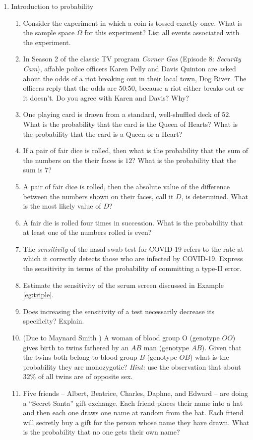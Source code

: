 \documentclass[11pt]{article}
\begin{document}
\begin{enumerate}
  \item Introduction to probability
    \begin{enumerate}
      \item Consider the experiment in which a coin is tossed exactly once. What is the sample space $\Omega$ for this experiment? List all events associated with the experiment.
      \item In Season 2 of the classic TV program {\it Corner Gas} (Episode 8: {\it Security Cam}), affable police officers Karen Pelly and Davis Quinton are asked about the odds of a riot breaking out in their local town, Dog River. The officers reply that the odds are 50:50, because a riot either breaks out or it doesn't. Do you agree with Karen and Davis? Why?
      \item One playing card is drawn from a standard, well-shuffled deck of $52$. What is the probability that the card is the Queen of Hearts? What is the probability that the card is a Queen or a Heart?
      \item If a pair of fair dice is rolled, then what is the probability that the sum of the numbers on the their faces is $12$? What is the probability that the sum is $7$? 
      \item A pair of fair dice is rolled, then the absolute value of the difference between the numbers shown on their faces, call it $D$, is determined. What is the most likely value of $D$?
      \item A fair die is rolled four times in succession. What is the probability that at least one of the numbers rolled is even?
      \item The {\it sensitivity} of the nasal-swab test for COVID-19 refers to the rate at which it correctly detects those who are infected by COVID-19. Express the sensitivity in terms of the probability of committing a type-II error.
      \item Estimate the sensitivity of the serum screen discussed in Example \ref{eg:triple}.
      \item Does increasing the sensitivity of a test necessarily decrease its specificity? Explain.
      \item (Due to Maynard Smith \cite{jms}) A woman of blood group O (genotype $OO$) gives birth to twins fathered by an $AB$ man (genotype $AB$). Given that the twins both belong to blood group $B$ (genotype $OB$) what is the probability they are monozygotic? {\it Hint:} use the observation that about 32\% of all twins are of opposite sex.
      \item Five friends -- Albert, Beatrice, Charles, Daphne, and Edward -- are doing a ``Secret Santa'' gift exchange. Each friend places their name into a hat and then each one draws one name at random from the hat. Each friend will secretly buy a gift for the person whose name they have drawn. What is the probability that no one gets their own name?
    \end{enumerate}


\end{enumerate}
\end{document}
